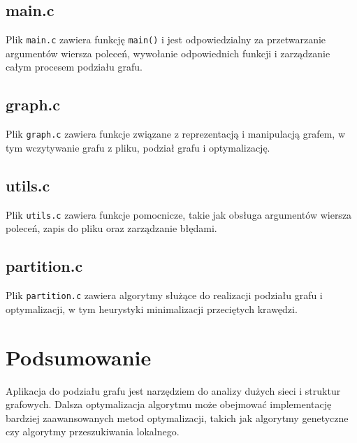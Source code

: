 \documentclass[a4paper,12pt]{article}
\begin{document}
\subsection{main.c}
Plik \texttt{main.c} zawiera funkcję \texttt{main()} i jest odpowiedzialny za przetwarzanie argumentów wiersza poleceń, wywołanie odpowiednich funkcji i zarządzanie całym procesem podziału grafu.

\subsection{graph.c}
Plik \texttt{graph.c} zawiera funkcje związane z reprezentacją i manipulacją grafem, w tym wczytywanie grafu z pliku, podział grafu i optymalizację.

\subsection{utils.c}
Plik \texttt{utils.c} zawiera funkcje pomocnicze, takie jak obsługa argumentów wiersza poleceń, zapis do pliku oraz zarządzanie błędami.

\subsection{partition.c}
Plik \texttt{partition.c} zawiera algorytmy służące do realizacji podziału grafu i optymalizacji, w tym heurystyki minimalizacji przeciętych krawędzi.

\section{Podsumowanie}
Aplikacja do podziału grafu jest narzędziem do analizy dużych sieci i struktur grafowych. Dalsza optymalizacja algorytmu może obejmować implementację bardziej zaawansowanych metod optymalizacji, takich jak algorytmy genetyczne czy algorytmy przeszukiwania lokalnego.
\end{document}
